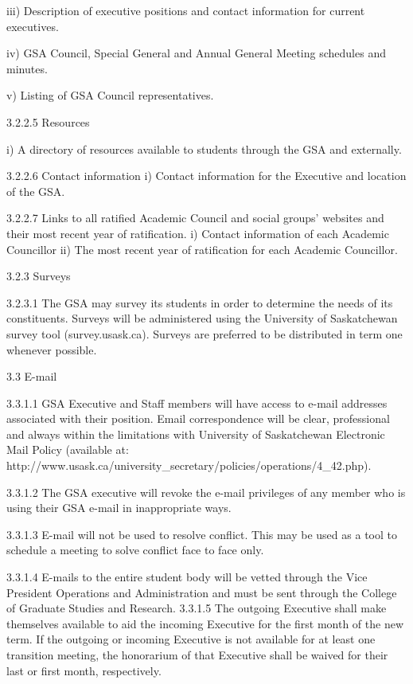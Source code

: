  iii) Description of executive positions and contact information for current 
 executives. 
 
 iv) GSA Council, Special General and Annual General Meeting schedules 
 and minutes. 

 v) Listing of GSA Council representatives. 
 
 3.2.2.5 Resources 
 
 i) A directory of resources available to students through the GSA and 
 externally. 
 
 3.2.2.6 Contact information 
 i) Contact information for the Executive and location of the GSA. 
 
 3.2.2.7 Links to all ratified Academic Council and social groups’ websites 
 and their most recent year of ratification. 
 i) Contact information of each Academic Councillor 
 ii) The most recent year of ratification for each Academic Councillor. 
 
 3.2.3 Surveys 
 
 3.2.3.1 The GSA may survey its students in order to determine the needs of 
 its constituents. Surveys will be administered using the University of 
 Saskatchewan survey tool (survey.usask.ca). Surveys are preferred to be 
 distributed in term one whenever possible. 
 
 
 3.3 E-mail 
 
 3.3.1.1 GSA Executive and Staff members will have access to e-mail 
 addresses associated with their position. Email correspondence will be clear, 
 professional and always within the limitations with University of 
 Saskatchewan Electronic Mail Policy (available at: 
 http://www.usask.ca/university_secretary/policies/operations/4_42.php). 
 
 3.3.1.2 The GSA executive will revoke the e-mail privileges of any member 
 who is using their GSA e-mail in inappropriate ways. 
 
 3.3.1.3 E-mail will not be used to resolve conflict. This may be used as a tool 
 to schedule a meeting to solve conflict face to face only. 

 3.3.1.4 E-mails to the entire student body will be vetted through the Vice 
 President Operations and Administration and must be sent through the 
 College of Graduate Studies and Research. 
 3.3.1.5 The outgoing Executive shall make themselves available to aid the 
 incoming Executive for the first month of the new term. If the outgoing or 
 incoming Executive is not available for at least one transition meeting, the 
 honorarium of that Executive shall be waived for their last or first month, 
 respectively. 
 
